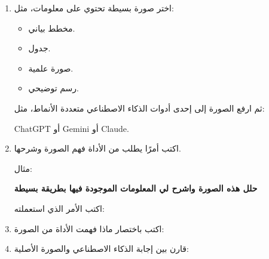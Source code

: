 \documentclass[a4paper]{article}
\begin{document}
\begin{enumerate}


\item اختر صورة بسيطة تحتوي على معلومات، مثل:

\begin{itemize}

    \item مخطط بياني.

    \item جدول.

    \item صورة علمية.

    \item رسم توضيحي.

\end{itemize}

ثم ارفع الصورة إلى إحدى أدوات الذكاء الاصطناعي
متعددة الأنماط، مثل:

\textenglish{ChatGPT} أو \textenglish{Gemini} أو
\textenglish{Claude}.


\item اكتب أمرًا يطلب من الأداة فهم الصورة وشرحها.

مثال:

\begin{center}

\textbf{
حلل هذه الصورة واشرح لي المعلومات الموجودة فيها
بطريقة بسيطة
}

\end{center}

اكتب الأمر الذي استعملته:




\item اكتب باختصار ماذا فهمت الأداة من الصورة:


\item قارن بين إجابة الذكاء الاصطناعي والصورة الأصلية:

\begin{center}

\begin{tabular}{|
>{\centering\arraybackslash}m{4cm}|
>{\centering\arraybackslash}m{5cm}|
>{\centering\arraybackslash}m{5cm}|}

\hline


\end{tabular}
\end{center}
\end{enumerate}
\end{document}
